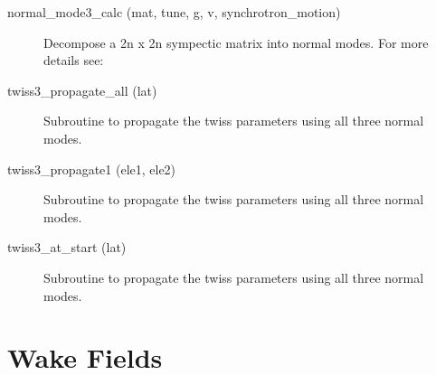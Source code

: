 \begin{description}

\item[normal_mode3_calc (mat, tune, g, v, synchrotron_motion)] \Newline 
Decompose a 2n x 2n sympectic matrix into normal modes.
For more details see:

\item[twiss3_propagate_all (lat)] \Newline 
Subroutine to propagate the twiss parameters using all three normal modes.

\item[twiss3_propagate1 (ele1, ele2)] \Newline 
Subroutine to propagate the twiss parameters using all three normal modes.

\item[twiss3_at_start (lat)] \Newline 
Subroutine to propagate the twiss parameters using all three normal modes.


\end{description}

\section{Wake Fields}
\label{r:wake}    

